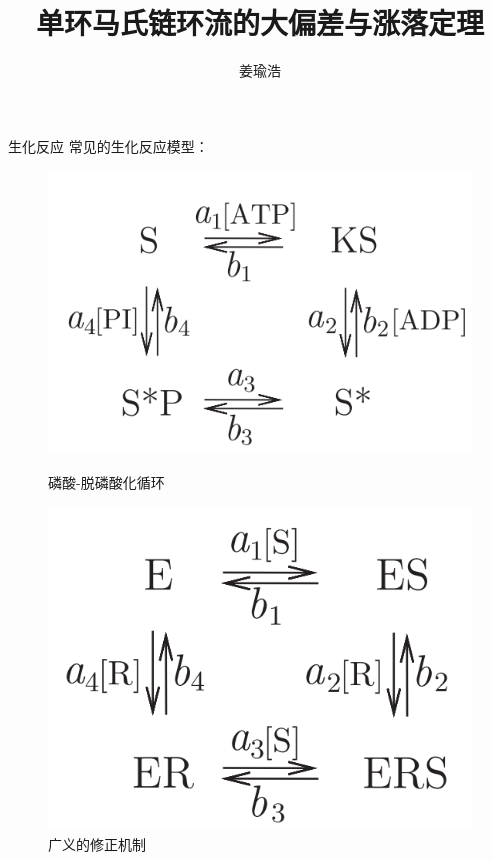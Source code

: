 \documentclass{beamer}
\title[单环马氏链环流的大偏差与涨落定理]{单环马氏链环流的大偏差与涨落定理}
\author{姜瑜浩}
\institute[CSRC]
{\normalsize 指导老师：贾晨 教授\\
北京计算科学研究中心
}
\begin{document}
\frame{\titlepage}
\begin{frame}{生化反应}
	常见的生化反应模型：
	\begin{figure}[h]
		\begin{minipage}[t]{0.4\linewidth}
			\centering
			\includegraphics[scale=0.4]{chart/phosphorylation_dephosphorylation_cycle.png}
			\caption{磷酸-脱磷酸化循环}
		\end{minipage}
		\begin{minipage}[t]{0.4\linewidth}
			\centering
			\includegraphics[scale=0.4]{chart/general_modifier_machanism.png}
			\caption{广义的修正机制}
		\end{minipage}
	\end{figure}


\end{frame}
\end{document}
